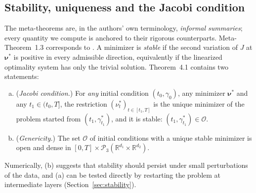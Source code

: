 \documentclass[11pt,leqno]{amsart}
\newcommand{\R}{\mathbb{R}}
\newcommand{\cP}{\mathcal{P}}
\newcommand{\cO}{\mathcal{O}}
\newcommand{\bnu}{\boldsymbol{\nu}}
\numberwithin{equation}{section}
\theoremstyle{definition}
\begin{document}
\subsection{Stability, uniqueness and the Jacobi condition}
The meta-theorems are, in the authors' own terminology, \emph{informal
summaries}; every quantity we compute is anchored to their rigorous
counterparts.  Meta-Theorem~1.3 corresponds to
\cite[Theorem~4.1]{DaudinDelarue2025}.  A minimizer is \emph{stable} if
the second variation of $J$ at $\bnu^*$ is positive in every admissible
direction, equivalently if the linearized optimality system has only the
trivial solution.  Theorem~4.1 contains two statements:
\begin{enumerate}[(a)]
\item (\emph{Jacobi condition.}) For \emph{any} initial condition
      $(t_0,\gamma_0)$, any minimizer $\bnu^*$ and any $t_1\in(t_0,T]$,
      the restriction $(\nu^*_t)_{t\in[t_1,T]}$ is the unique minimizer
      of the problem started from $(t_1,\gamma^*_{t_1})$, and it is
      stable: $(t_1,\gamma^*_{t_1})\in\cO$.
\item (\emph{Genericity.}) The set $\cO$ of initial conditions with a
      unique stable minimizer is open and dense in
      $[0,T]\times\cP_3(\R^{d_1}\times\R^{d_2})$.
\end{enumerate}
Numerically, (b) suggests that stability should persist under small
perturbations of the data, and (a) can be tested directly by restarting
the problem at intermediate layers (Section~\ref{sec:stability}).
\end{document}
